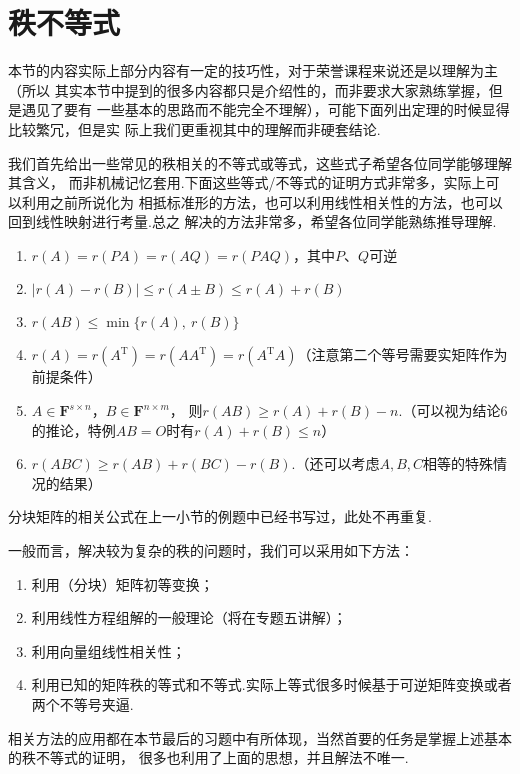 \section{秩不等式}
本节的内容实际上部分内容有一定的技巧性，对于荣誉课程来说还是以理解为主（所以
其实本节中提到的很多内容都只是介绍性的，而非要求大家熟练掌握，但是遇见了要有
一些基本的思路而不能完全不理解），可能下面列出定理的时候显得比较繁冗，但是实
际上我们更重视其中的理解而非硬套结论.

我们首先给出一些常见的秩相关的不等式或等式，这些式子希望各位同学能够理解其含义，
而非机械记忆套用.下面这些等式/不等式的证明方式非常多，实际上可以利用之前所说化为
相抵标准形的方法，也可以利用线性相关性的方法，也可以回到线性映射进行考量.总之
解决的方法非常多，希望各位同学能熟练推导理解.
\begin{enumerate}
    \item $r(A)=r(PA)=r(AQ)=r(PAQ)$，其中$P$、$Q$可逆
    \item $|r(A)-r(B)|\leqslant r(A\pm B) \leqslant r(A)+r(B)$
    \item $r(AB) \leqslant \min\{r(A),\ r(B)\}$
    \item $r(A)=r(A^\mathrm{T})=r(AA^\mathrm{T})=r(A^\mathrm{T}A)$（注意第二个等号需要实矩阵作为前提条件）
    \item $A \in \mathbf{F}^{s \times n}$，$B \in \mathbf{F}^{n \times m}$，
    则$r(AB) \geqslant r(A)+r(B)-n$.（可以视为结论6的推论，特例$AB=O$时有$r(A)+r(B)\leqslant n$）
    \item $r(ABC) \geqslant r(AB)+r(BC)-r(B)$.（还可以考虑$A,B,C$相等的特殊情况的结果）
\end{enumerate}

分块矩阵的相关公式在上一小节的例题中已经书写过，此处不再重复.

一般而言，解决较为复杂的秩的问题时，我们可以采用如下方法：
\begin{enumerate}
    \item 利用（分块）矩阵初等变换；

    \item 利用线性方程组解的一般理论（将在专题五讲解）；

    \item 利用向量组线性相关性；

    \item 利用已知的矩阵秩的等式和不等式.实际上等式很多时候基于可逆矩阵变换或者两个不等号夹逼.
\end{enumerate}

相关方法的应用都在本节最后的习题中有所体现，当然首要的任务是掌握上述基本的秩不等式的证明，
很多也利用了上面的思想，并且解法不唯一.

